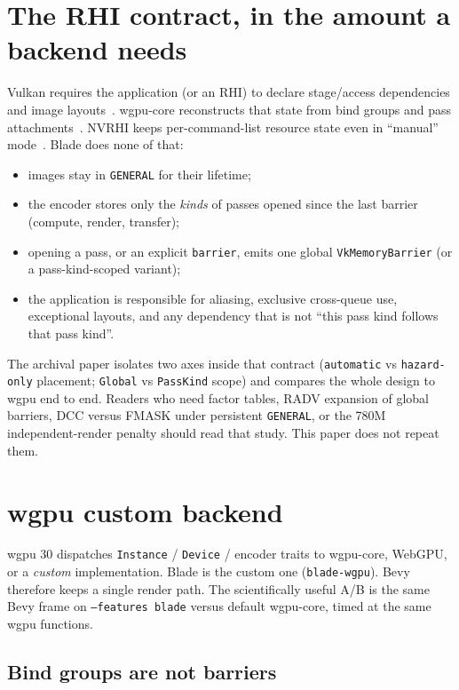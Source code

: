 \documentclass[10pt,twocolumn]{article}
\begin{document}
\section{The RHI contract, in the amount a backend needs}

Vulkan requires the application (or an RHI) to declare stage/access
dependencies and image layouts~\cite{vulkan-spec}. wgpu-core reconstructs
that state from bind groups and pass attachments~\cite{wgpu-trackers}.
NVRHI keeps per-command-list resource state even in ``manual''
mode~\cite{nvrhi-state-tracking}. Blade does none of that:

\begin{itemize}
  \item images stay in \texttt{GENERAL} for their lifetime;
  \item the encoder stores only the \emph{kinds} of passes opened since
        the last barrier (compute, render, transfer);
  \item opening a pass, or an explicit \texttt{barrier}, emits one global
        \texttt{VkMemoryBarrier} (or a pass-kind-scoped variant);
  \item the application is responsible for aliasing, exclusive
        cross-queue use, exceptional layouts, and any dependency that is
        not ``this pass kind follows that pass kind''.
\end{itemize}

The archival paper isolates two axes inside that contract
(\texttt{automatic} vs \texttt{hazard-only} placement; \texttt{Global} vs
\texttt{PassKind} scope) and compares the whole design to wgpu end to
end. Readers who need factor tables, RADV expansion of global barriers,
DCC versus FMASK under persistent \texttt{GENERAL}, or the 780M
independent-render penalty should read that study. This paper does not
repeat them.

\section{wgpu custom backend}

wgpu 30 dispatches \texttt{Instance} / \texttt{Device} / encoder traits
to wgpu-core, WebGPU, or a \emph{custom} implementation. Blade is the
custom one (\texttt{blade-wgpu}). Bevy therefore keeps a single render
path. The scientifically useful A/B is the same Bevy frame on
\texttt{--features blade} versus default wgpu-core, timed at the same
wgpu functions.

\subsection{Bind groups are not barriers}
\end{document}
